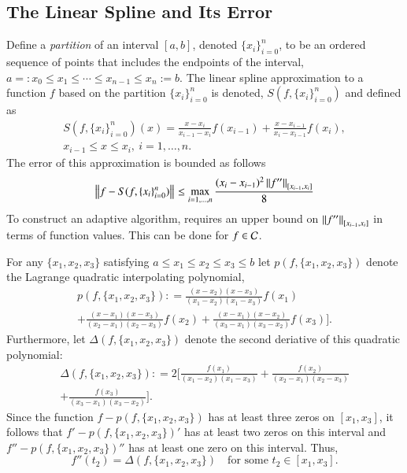 \documentclass[review]{elsarticle}
\newcommand{\datasites}{\{x_i\}_{i=0}^n}
\begin{document}
\subsection{The Linear Spline and Its Error}
Define a \emph{partition} of an interval $[a, b]$, denoted $\datasites$, to be an ordered sequence of points that includes the endpoints of the interval,  $a=:x_0 \le x_1 \le \cdots \le x_{n-1} \le x_{n}:=b$.   The linear spline approximation to a function $f$ based on the partition $\datasites$ is denoted, $S(f,\datasites)$ and defined as
\begin{multline} \label{splinedef}
S(f,\datasites)(x) =  \frac{x-x_i}{x_{i-1} - x_i} f(x_{i-1}) + \frac{x-x_{i-1}}{x_{i} - x_{i-1}}f(x_i), \\ x_{i-1} \le x \le x_i, \ i=1, \ldots, n.
\end{multline}
The error of this approximation is bounded as follows
\begin{equation} \label{appxerrbda}
\norm{f - S(f,\datasites)} \le \max_{i=1, \ldots, n} \frac{(x_i - x_{i-1})^2\norm[{[x_{i-1},x_i]}]{f''}}{8}
\end{equation}
To construct an adaptive algorithm, requires an upper bound on $\norm[{[x_{i-1},x_i]}]{f''}$ in terms of function values.  This can be done for $f \in \cc$.

For any $\{x_1, x_2, x_3\}$ satisfying $a \le x_1 \le x_2 \le x_3 \le b$ let  $p(f,\{x_1, x_2, x_3\})$ denote the Lagrange quadratic interpolating polynomial,
\begin{multline*}
p(f,\{x_1, x_2, x_3\}) : = \frac{(x-x_2)(x-x_3)}{(x_1-x_2)(x_1 - x_3)}f(x_1) \\ + \frac{(x-x_1)(x-x_3)}{(x_2-x_1)(x_2 - x_3)}f(x_2) + \frac{(x-x_1)(x-x_2)}{(x_3-x_1)(x_3 - x_2)}f(x_3) \biggr ].
\end{multline*}
Furthermore, let $\Delta(f,\{x_1, x_2, x_3\})$ denote the second deriative of this quadratic polynomial:
\begin{multline} \label{Deltadef}
\Delta(f,\{x_1, x_2, x_3\}) : = 2 \biggl[ \frac{f(x_1)}{(x_1-x_2)(x_1 - x_3)} + \frac{f(x_2)}{(x_2-x_1)(x_2 - x_3)} \\
+ \frac{f(x_3)}{(x_3-x_1)(x_3 - x_2)} \biggr ].
\end{multline}
Since the function $f - p(f,\{x_1, x_2, x_3\})$ has at least three zeros on $[x_1, x_3]$, it follows that $f' - p(f,\{x_1, x_2, x_3\})'$ has at least two zeros on this interval and $f'' - p(f,\{x_1, x_2, x_3\})''$ has at least one zero on this interval.  Thus,
\begin{equation} \label{fppDeltaa}
f''(t_2) = \Delta(f,\{x_1, x_2, x_3\}) \quad \text{for some } t_2 \in [x_1, x_3].
\end{equation}
\end{document}
